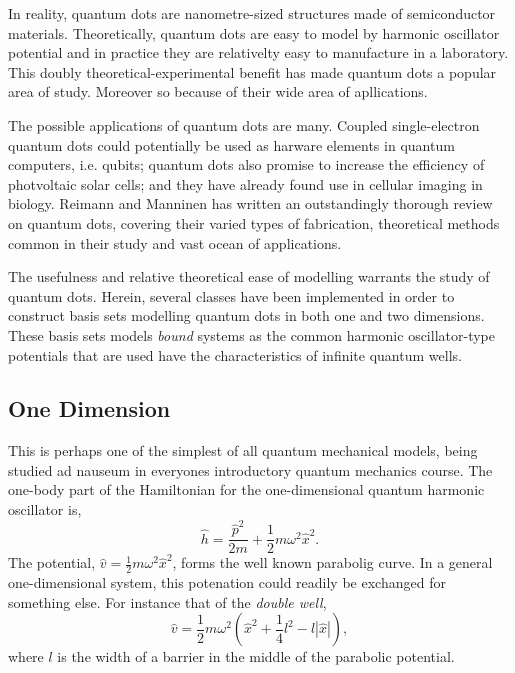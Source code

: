 In reality, quantum dots are nanometre-sized structures made of semiconductor materials.
Theoretically, quantum dots are easy to model by harmonic oscillator potential and in practice
they are relativelty easy to manufacture in a laboratory. This doubly
theoretical-experimental benefit has made quantum dots a popular area of study. Moreover so 
because of their wide area of apllications.

The possible applications of quantum dots are many. Coupled single-electron quantum dots 
could potentially be used as harware elements in quantum computers, i.e.
qubits\cite{loss1998quantum}; quantum dots also promise to increase the efficiency of 
photvoltaic solar cells; and they have already found use in cellular imaging in biology.
Reimann and Manninen\cite{reimann2002electronic} has written an outstandingly
thorough review on quantum dots, covering their varied types of fabrication, theoretical
methods common in their study and vast ocean of applications.

The usefulness and relative theoretical ease of modelling warrants the study of quantum dots.
Herein, several classes have been implemented in order to construct basis sets modelling 
quantum dots in both one and two dimensions. These basis sets models \emph{bound} systems
as the common harmonic oscillator-type potentials that are used have the characteristics of 
infinite quantum wells. 

\subsection{One Dimension}

This is perhaps one of the simplest of all quantum mechanical 
models, being studied ad nauseum in everyones introductory quantum 
mechanics course. The one-body part of the Hamiltonian for the one-dimensional quantum 
harmonic oscillator is,
\begin{equation}
    \label{eq:1d_ho_hamiltonian}
    \hat{h} = \frac{\hat{p}^2}{2m} + \frac{1}{2}m \omega^2\hat{x}^2.
\end{equation}
The potential, $\hat{v} = \frac{1}{2}m \omega^2\hat{x}^2$, forms the well known 
parabolig curve. In a general one-dimensional system, this potenation could 
readily be exchanged for something else. For instance that of the 
\emph{double well},
\begin{equation}
    \hat{v} = \frac{1}{2} m \omega^2
        \left(\hat{x}^2 + \frac{1}{4}l^2 - l |\hat{x}|\right),
\end{equation}
where $l$ is the width of a barrier in the middle of the parabolic 
potential.

